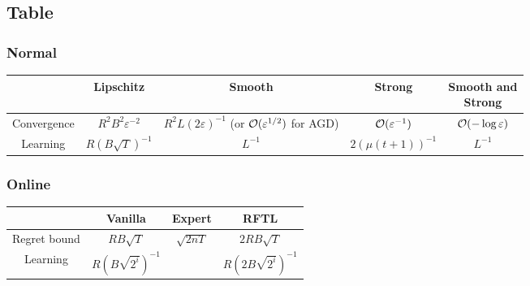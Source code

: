 \documentclass[12pt]{extarticle}
\numberwithin{equation}{subsection}
\begin{document}
\subsection{Table}

\subsubsection{Normal}

\begin{table}[H]
	\centering
	\def\arraystretch{2}
	\begin{tabular}{|c|c|c|c|c|}
		\hline
		                            &
		\textbf{Lipschitz}          &
		\textbf{Smooth}             &
		\textbf{Strong}             &
		\makecell{\textbf{Smooth and}          \\ \textbf{Strong}}
		\\
		\hline
		Convergence                 &
		$ R^2 B^2 \varepsilon^{-2}$ &
		\makecell{$ R^2 L (2\varepsilon)^{-1}$ \\ (or $\mathcal{O}(\varepsilon^{1/2})$ for AGD)} &
		$ \mathcal{O} (\varepsilon^{-1})$    &
		$ \mathcal{O} (-\log  \varepsilon)$
		\\
		\hline
		Learning                    &
		$R (B \sqrt{T})^{-1}$       &
		$L^{-1}$                    &
		$ 2 (\mu (t + 1))^{-1}$     &
		$L^{-1}$
		\\
		\hline
	\end{tabular}
\end{table}

\subsubsection{Online}

\begin{table}[H]
	\centering
	\def\arraystretch{2}
	\begin{tabular}{|c|c|c|c|}
		\hline                  &
		\textbf{Vanilla}        &
		\textbf{Expert}         &
		\textbf{RFTL}
		\\
		\hline
		Regret bound            &
		$ RB \sqrt T$           &
		$ \sqrt{2nT} $          &
		$ 2RB \sqrt T  $
		\\
		\hline
		Learning                &
		$R (B \sqrt{2^i})^{-1}$ &
		                        &
		$ R (2 B \sqrt{2^i})^{-1}$
		\\
		\hline
	\end{tabular}
\end{table}
\end{document}
